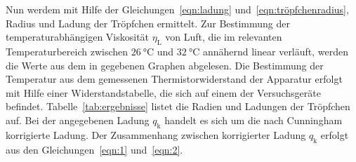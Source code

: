 \documentclass[
  bibliography=totoc,     %
  captions=tableheading,  %
  titlepage=firstiscover, %
]{scrartcl}
\begin{document}
Nun werdem mit Hilfe der Gleichungen~\eqref{eqn:ladung} und~\eqref{eqn:tröpfchenradius}, Radius und Ladung der Tröpfchen ermittelt. Zur Bestimmung der temperaturabhängigen Viskosität $\eta_{\mathup{L}}$ von Luft, die im relevanten Temperaturbereich zwischen $\SI{26}{\celsius}$ und $\SI{32}{\celsius}$ annähernd linear verläuft, werden die Werte aus dem in \cite{anleitung} gegebenen Graphen abgelesen.
 Die Bestimmung der Temperatur aus dem gemessenen Thermistorwiderstand der Apparatur erfolgt mit Hilfe einer Widerstandstabelle, die sich auf einem der Versuchsgeräte befindet. Tabelle~\ref{tab:ergebnisse} listet die Radien und Ladungen der Tröpfchen auf. Bei der angegebenen Ladung $q_{\mathup{k}}$ handelt es sich um die nach Cunningham korrigierte Ladung. Der Zusammenhang zwischen korrigierter Ladung $q_{\mathup{k}}$ erfolgt aus den Gleichungen~\eqref{eqn:1} und~\eqref{eqn:2}.
\end{document}
